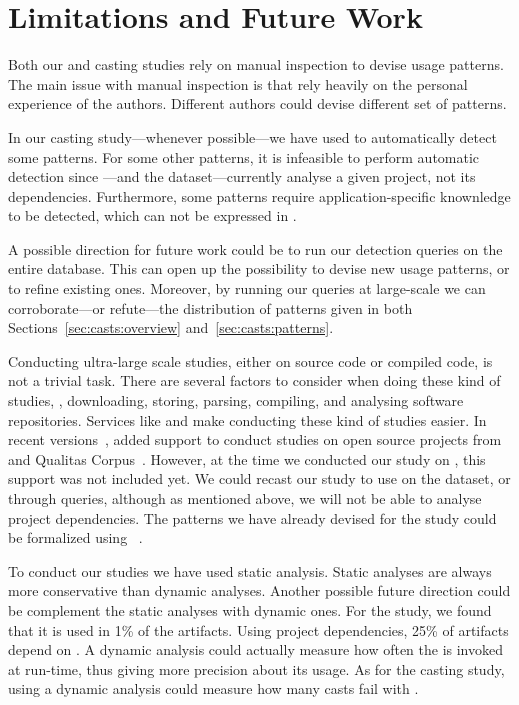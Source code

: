\section{Limitations and Future Work}

Both our \unsafe{} and casting studies rely on manual inspection to devise usage patterns.
The main issue with manual inspection is that rely heavily on the personal experience of the authors.
Different authors could devise different set of patterns.

In our casting study---whenever possible---we have used \ql{} to automatically detect some patterns.
For some other patterns, it is infeasible to perform automatic detection since \ql{}---and the \lgtm{} dataset---currently analyse a given project,
not its dependencies.
Furthermore, some patterns require application-specific knownledge to be detected,
which can not be expressed in \ql{}.

A possible direction for future work could be to run our detection queries on the entire \lgtm{} database.
This can open up the possibility to devise new usage patterns,
or to refine existing ones.
Moreover,
by running our queries at large-scale we can corroborate---or refute---the distribution of patterns given in both Sections~\ref{sec:casts:overview} and~\ref{sec:casts:patterns}.

Conducting ultra-large scale studies, either on source code or compiled code, is not a trivial task.
There are several factors to consider when doing these kind of studies,
\eg{}, downloading, storing, parsing, compiling,
and analysing software repositories.
Services like \boa{} and \lgtm{} make conducting these kind of studies easier.
In recent versions~\citep{boa-github},
\boa{} added support to conduct studies on open source projects from \github{} and Qualitas Corpus~\citep{temperoQualitasCorpusCurated2010}.
However, at the time we conducted our study on \unsafe{},
this support was not included yet.
We could recast our \unsafe{} study to use \boa{} on the \github{} dataset,
or \lgtm{} through \ql{} queries, although as mentioned above,
we will not be able to analyse project dependencies.
The patterns we have already devised for the \unsafe{} study could be formalized using \ql{}~\citep{avgustinovQLObjectorientedQueries2016}.

To conduct our studies we have used static analysis.
Static analyses are always more conservative than dynamic analyses.
Another possible future direction could be complement the static analyses with dynamic ones.
For the \unsafe{} study,
we found that it is used in 1\% of the \mavencentral{} artifacts.
Using project dependencies, 25\% of artifacts depend on \smu{}.
A dynamic analysis could actually measure how often the \unsafe{} \api{} is invoked at run-time,
thus giving more precision about its usage.
As for the casting study,
using a dynamic analysis could measure how many casts fail with .

